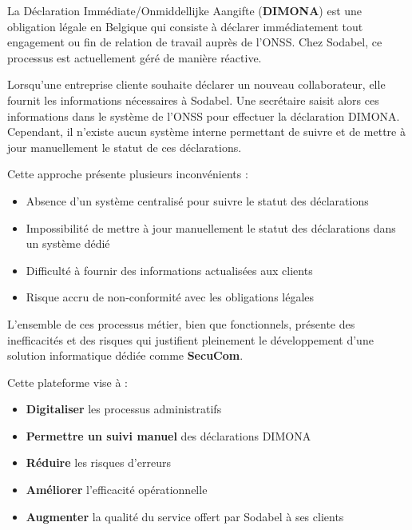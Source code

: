 La Déclaration Immédiate/Onmiddellijke Aangifte (\textbf{DIMONA}) est une obligation légale en Belgique qui consiste à déclarer immédiatement tout engagement ou fin de relation de travail auprès de l'ONSS. Chez Sodabel, ce processus est actuellement géré de manière réactive.

\noindent Lorsqu'une entreprise cliente souhaite déclarer un nouveau collaborateur, elle fournit les informations nécessaires à Sodabel. Une secrétaire saisit alors ces informations dans le système de l'ONSS pour effectuer la déclaration DIMONA. Cependant, il n'existe aucun système interne permettant de suivre et de mettre à jour manuellement le statut de ces déclarations.

\noindent Cette approche présente plusieurs inconvénients :
\begin{itemize}[leftmargin=*,label=\textcolor{darkgray}{$\bullet$},itemsep=0.3em]
  \item Absence d'un système centralisé pour suivre le statut des déclarations
  \item Impossibilité de mettre à jour manuellement le statut des déclarations dans un système dédié
  \item Difficulté à fournir des informations actualisées aux clients
  \item Risque accru de non-conformité avec les obligations légales
\end{itemize}

\begin{tcolorbox}[
  title={\textbf{Solution proposée : SecuCom}},
  colback=blue!5!white,
  colframe=primarycolor,
  fonttitle=\bfseries,
  boxrule=0.5mm,
  arc=2mm,
  left=6mm,
  right=6mm,
  top=6mm,
  bottom=6mm
]
\noindent L'ensemble de ces processus métier, bien que fonctionnels, présente des inefficacités et des risques qui justifient pleinement le développement d'une solution informatique dédiée comme \textbf{SecuCom}.

\noindent Cette plateforme vise à :
\begin{itemize}[leftmargin=*,label=\textcolor{darkgray}{$\bullet$},itemsep=0.3em]
  \item \textbf{Digitaliser} les processus administratifs
  \item \textbf{Permettre un suivi manuel} des déclarations DIMONA
  \item \textbf{Réduire} les risques d'erreurs
  \item \textbf{Améliorer} l'efficacité opérationnelle
  \item \textbf{Augmenter} la qualité du service offert par Sodabel à ses clients
\end{itemize}
\end{tcolorbox}

